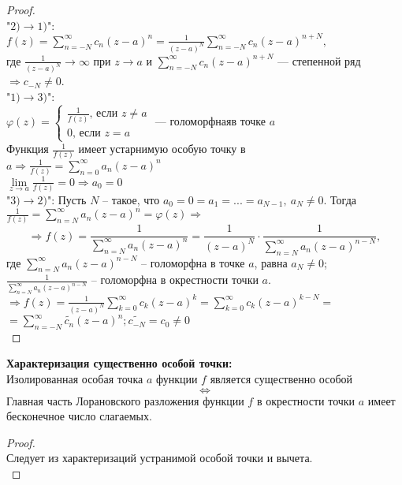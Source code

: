 \begin{proof}
    \ \\
    "$2) \to 1)$":\\
    $f(z)=\sum_{n=-N}^\infty c_n(z-a)^n=\frac{1}{(z-a)^N}\sum_{n=-N}^\infty c_n (z-a)^{n+N},$\\
    где $\frac{1}{(z-a)^N}\to \infty$ при $z\to a$ и $\sum_{n=-N}^\infty c_n (z-a)^{n+N}$ --- степенной ряд $\Rightarrow c_{-N} \neq 0$.\\[2mm]
    "$1) \to 3)$":\\
    $\varphi(z)=
    \begin{cases}
        \frac{1}{f(z)}\text{, если }z\neq a\\
        0\text{, если }z=a
    \end{cases}
    \text{ --- голоморфнаяв точке }a$\\
    Функция $\frac{1}{f(z)}$ имеет устарнимую особую точку в $a \Rightarrow \frac{1}{f(z)}=\sum_{n=0}^\infty a_n(z-a)^n$\\
    $\lim\limits_{z\to a}\frac{1}{f(z)}=0\Rightarrow a_0 =0$\\[2mm]
    "$3) \to 2)$":
    Пусть $N$ -- такое, что $a_0 = 0 = a_1=...=a_{N-1}, \ a_N \neq 0$.   Тогда $\frac{1}{f(z)}=\sum_{n=N}^\infty a_n(z-a)^n=\varphi(z) \Rightarrow $
    $$\Rightarrow f(z)=\frac{1}{\sum_{n=N}^\infty a_n(z-a)^n}=\frac{1}{(z-a)^N}\cdot \frac{1}{\sum_{n=N}^\infty a_n (z-a)^{n-N}},$$
    где $\sum_{n=N}^\infty a_n (z-a)^{n-N}$ -- голоморфна в точке $a$, равна $a_N \neq 0$;\\
    $\frac{1}{\sum_{n=N}^\infty a_n (z-a)^{n-N}}$ -- голоморфна в окрестности точки $a$.\\
    $\Rightarrow f(z)=\frac{1}{(z-a)^N}\sum_{k=0}^\infty c_k (z-a)^k = \sum_{k=0}^\infty c_k (z-a)^{k-N}=$\\
    $=\sum_{n=-N}^\infty \tilde{c_n}(z-a)^n; \tilde{c_{-N}}=c_0\neq 0$\\[2mm]
\end{proof}

\textbf{Характеризация существенно особой точки:}\\
Изолированная особая точка $a$ функции $f$ является существенно особой
$$\Leftrightarrow$$
Главная часть Лорановского разложения функции $f$ в окрестности точки $a$ имеет бесконечное число слагаемых.\\
\begin{proof}
    \ \\
    Следует из характеризаций устранимой особой точки и вычета.\\[2mm]
\end{proof}


